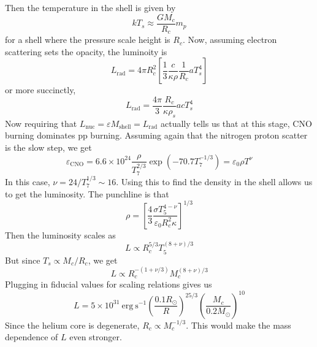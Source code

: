 \documentclass[10pt]{article}
\numberwithin{equation}{section}
\newcommand{\n}{\noindent}
\begin{document}
    \n Then the temperature in the shell is given by
    \begin{equation}
      \label{eq:240}
      kT_s\approx \frac{GM_c}{R_c}m_p
    \end{equation}
    for a shell where the pressure scale height is $R_c$. Now,
    assuming electron scattering sets the opacity, the luminoity is
    \begin{equation}
      \label{eq:241}
      L_{\mathrm{rad}}=4\pi R_c^2\left[\frac{1}{3}\frac{c}{\kappa\rho}\frac
{1}{R_c}aT_s^4\right]
    \end{equation}
    or more succinctly,
    \begin{equation}
      \label{eq:242}
      \boxed{L_{\mathrm{rad}}=\frac{4\pi}{3}\frac{R_c}{\kappa\rho_s}
acT_s^4}
    \end{equation}
    Now requiring that $L_{\mathrm{nuc}}=\varepsilon
    M_{\mathrm{shell}}=L_{\mathrm{rad}}$ actually tells us that at
    this stage, CNO burning dominates pp burning. Assuming again that
    the nitrogen proton scatter is the slow step, we get
    \begin{equation}
      \label{eq:243}
      \varepsilon_{\mathrm{CNO}}=6.6\times
      10^{24}\frac{\rho}{T_7^{2/3}}\exp\left(-70.7
        T_7^{-1/3}\right)=\varepsilon_0\rho T^\nu
    \end{equation}
    In this case, $\nu=24/T_7^{1/3}\sim 16$. Using this to find the
    density in the shell allows us to get the luminosity. The
    punchline is that 
    \begin{equation}
      \label{eq:244}
      \rho=\left[\frac{4}{3}\frac{\sigma T_5^{4-\nu}}
{\varepsilon_0R_c^2\kappa}\right]^{1/3}
    \end{equation}
    Then the luminosity scales as
    \begin{equation}
      \label{eq:245}
      L\propto R_c^{5/3}T_5^{(8+\nu)/3}
    \end{equation}
    But since $T_s\propto M_c/R_c$, we get
    \begin{equation}
      \label{eq:246}
      L\propto R_c^{-(1+\nu/3)}M_c^{(8+\nu)/3}
    \end{equation}
    Plugging in fiducial values for scaling relations gives us
    \begin{equation}
      \label{eq:247}
      L=5\times 10^{31}\ \mathrm{erg\ s^{-1}}\left(\frac{0.1R_\odot}{R}
\right)^{25/3}\left(\frac{M_c}{0.2M_\odot}\right)^{10}
    \end{equation}
    Since the helium core is degenerate, $R_c\propto M_c^{-1/3}$. This
    would make the mass dependence of $L$ even stronger. \\
\end{document}
